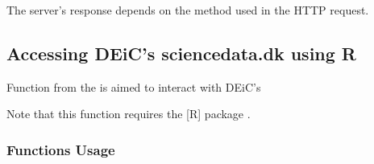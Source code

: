\documentclass[a4paper,12pt,english]{sphinxhowto}
\begin{document}

The server’s response depends on the method used in the HTTP request.



\subsection{Accessing DEiC’s sciencedata.dk using R}
\label{\detokenize{Sciencedata_dk:accessing-deic-s-sciencedata-dk-using-r}}
Function 
from the  is aimed to interact
with DEiC’s 

Note that this function requires the {[}R{]} package .


\subsubsection{Functions Usage}
\label{\detokenize{Sciencedata_dk:functions-usage}}

\begin{fulllineitems}
\label{\detokenize{Sciencedata_dk:request}}
\end{fulllineitems}


\begin{sphinxVerbatim}[commandchars=\\\{\},formatcom=\footnotesize]
 
\end{sphinxVerbatim}
\end{document}
